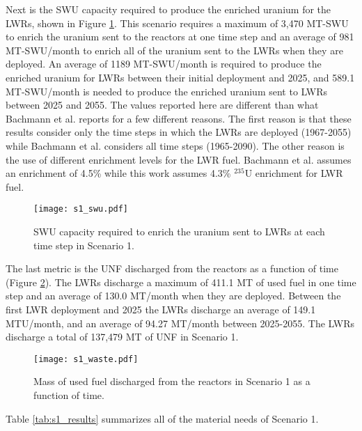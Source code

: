 Next is the \gls{SWU} capacity required 
to produce the enriched uranium for the \glspl{LWR}, 
shown in Figure \ref{fig:swu1}. This scenario requires a maximum of 3,470 
MT-SWU to 
enrich the uranium sent to the reactors at one time step and an average of 
981 MT-SWU/month to enrich all of the uranium sent to 
the \glspl{LWR} when they are deployed. An average of 
1189 MT-SWU/month is required to produce the enriched uranium 
for \glspl{LWR} between their initial deployment and 2025, and 
589.1 MT-SWU/month is needed to produce the 
enriched uranium sent to \glspl{LWR} between 2025 and 2055. The values 
reported here are different than what Bachmann et al. \cite{bachmann_enrichment_2021}
reports for a few different reasons. The first reason is that these results  
consider only
the time steps in which the \glspl{LWR} are deployed (1967-2055) while Bachmann et al. 
considers all time steps (1965-2090). The other reason
is the use of different enrichment levels for the \gls{LWR} fuel. 
Bachmann et al. assumes an enrichment of 4.5\% while this work assumes 4.3\%
$^{235}$U enrichment for \gls{LWR} fuel. 


\begin{figure}[h!]
    \centering
    \texttt{[image: s1\_swu.pdf]}
    \caption{SWU capacity required to enrich the uranium sent to LWRs at each time step in Scenario 1.}
    \label{fig:swu1}
\end{figure}

The last metric is the \gls{UNF} discharged from the reactors as a function of
time (Figure \ref{fig:waste1}). The \glspl{LWR} discharge a maximum of 411.1 MT 
of used fuel in one time step and an average of 130.0 MT/month when they are 
deployed. Between the first \gls{LWR} deployment and 2025 the \glspl{LWR} 
discharge an average of 149.1 MTU/month, and an average of 94.27 MT/month  
between 2025-2055. The \glspl{LWR} discharge a total of 137,479 MT of \gls{UNF} 
in Scenario 1. 

\begin{figure}[h!]
    \centering
    \texttt{[image: s1\_waste.pdf]}
    \caption{Mass of used fuel discharged from the reactors in Scenario 1 as a function of time.}
    \label{fig:waste1}
\end{figure}

Table \ref{tab:s1_results} summarizes all of the material needs of Scenario 1. 

